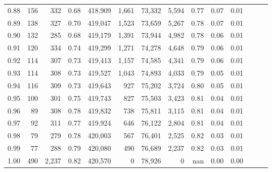 \begin{tabular}{rrrrrrrrrrrrrr}
0.88 &     156 &    332 &  0.68 &  418,909 &    1,661 &  73,332 &   5,594 &  0.77 &  0.07 &      0.01 \\
0.89 &     138 &    327 &  0.70 &  419,047 &    1,523 &  73,659 &   5,267 &  0.78 &  0.07 &      0.01 \\
0.90 &     132 &    285 &  0.68 &  419,179 &    1,391 &  73,944 &   4,982 &  0.78 &  0.06 &      0.01 \\
0.91 &     120 &    334 &  0.74 &  419,299 &    1,271 &  74,278 &   4,648 &  0.79 &  0.06 &      0.01 \\
0.92 &     114 &    307 &  0.73 &  419,413 &    1,157 &  74,585 &   4,341 &  0.79 &  0.06 &      0.01 \\
0.93 &     114 &    308 &  0.73 &  419,527 &    1,043 &  74,893 &   4,033 &  0.79 &  0.05 &      0.01 \\
0.94 &     116 &    309 &  0.73 &  419,643 &      927 &  75,202 &   3,724 &  0.80 &  0.05 &      0.01 \\
0.95 &     100 &    301 &  0.75 &  419,743 &      827 &  75,503 &   3,423 &  0.81 &  0.04 &      0.01 \\
0.96 &      89 &    308 &  0.78 &  419,832 &      738 &  75,811 &   3,115 &  0.81 &  0.04 &      0.01 \\
0.97 &      92 &    311 &  0.77 &  419,924 &      646 &  76,122 &   2,804 &  0.81 &  0.04 &      0.01 \\
0.98 &      79 &    279 &  0.78 &  420,003 &      567 &  76,401 &   2,525 &  0.82 &  0.03 &      0.01 \\
0.99 &      77 &    288 &  0.79 &  420,080 &      490 &  76,689 &   2,237 &  0.82 &  0.03 &      0.01 \\
1.00 &     490 &  2,237 &  0.82 &  420,570 &        0 &  78,926 &       0 &   nan &  0.00 &      0.00 \\
\bottomrule
\end{tabular}
